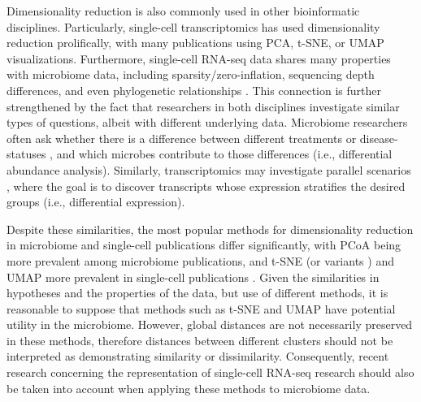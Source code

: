 Dimensionality reduction is also commonly used in other bioinformatic disciplines. Particularly, single-cell transcriptomics has used dimensionality reduction prolifically, with many publications using PCA, t-SNE, or UMAP visualizations. Furthermore, single-cell RNA-seq data shares many properties with microbiome data, including sparsity/zero-inflation, sequencing depth differences, and even phylogenetic relationships \cite{Lahnemann2020-ky}. This connection is further strengthened by the fact that researchers in both disciplines investigate similar types of questions, albeit with different underlying data. Microbiome researchers often ask whether there is a difference between different treatments or disease-statuses \cite{Llorens-Rico2021-dr,David2013-ps}, and which microbes contribute to those differences (i.e., differential abundance analysis). Similarly, transcriptomics may investigate parallel scenarios \cite{Ocasio2019-lb,Taavitsainen2021-ib}, where the goal is to discover transcripts whose expression stratifies the desired groups (i.e., differential expression).

Despite these similarities, the most popular methods for dimensionality reduction in microbiome and single-cell publications differ significantly, with PCoA being more prevalent among microbiome publications, and t-SNE (or variants \cite{Linderman2019-mt}) and UMAP more prevalent in single-cell publications \cite{Kobak2019-gk}. Given the similarities in hypotheses and the properties of the data, but use of different methods, it is reasonable to suppose that methods such as t-SNE and UMAP have potential utility in the microbiome. However, global distances are not necessarily preserved in these methods, therefore distances between different clusters should not be interpreted as demonstrating similarity or dissimilarity. Consequently, recent research concerning the representation of single-cell RNA-seq research should also be taken into account when applying these methods to microbiome data.

